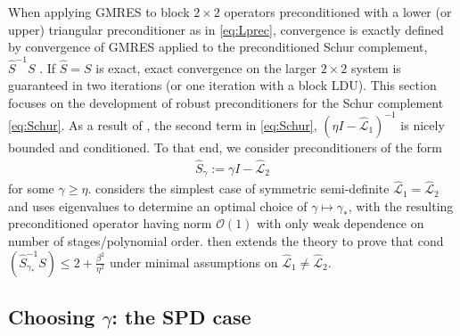 \documentclass[review]{siamart}
\begin{document}
When applying GMRES to block $2\times 2$ operators preconditioned with a lower
(or upper) triangular preconditioner as in \eqref{eq:Lprec}, convergence 
is exactly defined by convergence of GMRES applied to the preconditioned Schur
complement, $\widehat{S}^{-1}S$ \cite{2x2block}. If $\widehat{S} = S$ is exact,
exact convergence on the larger $2\times2$ system is guaranteed in two iterations
(or one iteration with a block LDU). This section focuses on the development of
robust preconditioners for the Schur complement \eqref{eq:Schur}. As a result of
, the second term in \eqref{eq:Schur},
$(\eta I - \widehat{\mathcal{L}}_1)^{-1}$ is nicely bounded and conditioned.
To that end, we consider preconditioners of the form
%
\begin{align*}
\widehat{S}_\gamma := \gamma I - \widehat{\mathcal{L}}_2
\end{align*}
%
for some $\gamma \geq \eta$.  considers the simplest case
of symmetric semi-definite $\widehat{\mathcal{L}}_1 = \widehat{\mathcal{L}}_2$
and uses eigenvalues to determine an optimal choice of $\gamma\mapsto\gamma_*$,
with the resulting preconditioned operator having norm $\mathcal{O}(1)$ with
only weak dependence on number of stages/polynomial order. 
then extends the theory to prove that cond$(\widehat{S}_{\gamma_*}^{-1}S)
\leq 2 + \tfrac{\beta^2}{\eta^2}$ under minimal assumptions on
$\widehat{\mathcal{L}}_1 \neq \widehat{\mathcal{L}}_2$. 

\subsection{Choosing $\gamma$: the SPD case}\label{sec:theory:spd}
\end{document}
